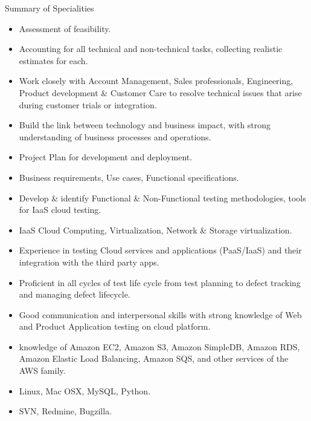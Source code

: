\documentclass[a4paper,12pt]{article}
\begin{document}
\begin{resumesummary}{Summary of Specialities}
\begin{itemize}
  \item Assessment of feasibility.
  \item Accounting for all technical and non-technical tasks, collecting realistic estimates for each.
  \item Work closely with Account Management, Sales professionals, Engineering, Product development \& Customer Care to resolve technical issues that arise during customer trials or integration.
  \item Build the link between technology and business impact, with strong understanding of business processes and operations.
  \item Project Plan for development and deployment.
  \item Business requirements, Use cases, Functional specifications.
  \item Develop \& identify Functional \& Non-Functional testing methodologies, tools for IaaS cloud testing.
  \item IaaS Cloud Computing, Virtualization, Network \& Storage virtualization.
  \item Experience in testing Cloud services and applications (PaaS/IaaS) and their integration with the third party apps.
  \item Proficient in all cycles of test life cycle from test planning to defect tracking and managing defect lifecycle.
  \item Good communication and interpersonal skills with strong knowledge of Web and Product Application testing on cloud platform.
  \item knowledge of Amazon EC2, Amazon S3, Amazon SimpleDB, Amazon RDS, Amazon Elastic Load Balancing, Amazon SQS, and other services of the AWS family.
  \item Linux, Mac OSX, MySQL, Python.
  \item SVN, Redmine, Bugzilla.
\newline
\end{itemize}
\end{resumesummary}
\end{document}
